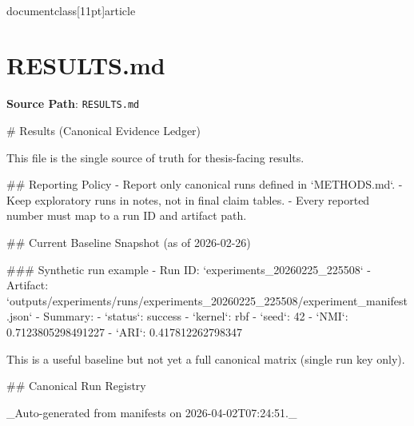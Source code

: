 \\documentclass[11pt]{article}
\begin{document}
\section*{RESULTS.md}
\textbf{Source Path}: \texttt{RESULTS.md}\par
\bigskip
\begin{CodeBlock}
# Results (Canonical Evidence Ledger)

This file is the single source of truth for thesis-facing results.

## Reporting Policy
- Report only canonical runs defined in `METHODS.md`.
- Keep exploratory runs in notes, not in final claim tables.
- Every reported number must map to a run ID and artifact path.

## Current Baseline Snapshot (as of 2026-02-26)

### Synthetic run example
- Run ID: `experiments_20260225_225508`
- Artifact: `outputs/experiments/runs/experiments_20260225_225508/experiment_manifest.json`
- Summary:
  - `status`: success
  - `kernel`: rbf
  - `seed`: 42
  - `NMI`: 0.7123805298491227
  - `ARI`: 0.417812262798347

This is a useful baseline but not yet a full canonical matrix (single run key only).

## Canonical Run Registry

_Auto-generated from manifests on 2026-04-02T07:24:51._


\end{CodeBlock}
\end{document}
